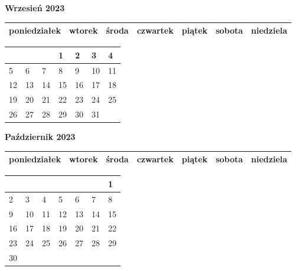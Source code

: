 \clearpage

\begin{landscape}
    \begin{center}
        \textbf{\huge{Wrzesień 2023}}
    \end{center}

    \vspace{-3mm}

    \thispagestyle{empty}
    \noindent
    \begin{tabularx}{28.7cm}{|Y|Y|Y|Y|Y|Y|Y|}
        \hline
poniedziałek & wtorek & środa & czwartek & piątek & sobota & niedziela \\ [-0.5mm]
        \hline
    \end{tabularx}

    \vspace{-0.5mm}

    \noindent
    \begin{tabularx}{28.7cm}{|X|X|X|X|X|X|X|}
        \hline
& & & 1 & 2 & 3 & 4 \\ [31.0mm]
\hline
5 & 6 & 7 & 8 & 9 & 10 & 11 \\ [31.0mm]
\hline
12 & 13 & 14 & 15 & 16 & 17 & 18 \\ [31.0mm]
\hline
19 & 20 & 21 & 22 & 23 & 24 & 25 \\ [31.0mm]
\hline
26 & 27 & 28 & 29 & 30 & 31 & \\ [31.0mm]
\hline

    \end{tabularx}
\end{landscape}

\clearpage

\begin{landscape}
    \begin{center}
        \textbf{\huge{Październik 2023}}
    \end{center}

    \vspace{-3mm}

    \thispagestyle{empty}
    \noindent
    \begin{tabularx}{28.7cm}{|Y|Y|Y|Y|Y|Y|Y|}
        \hline
poniedziałek & wtorek & środa & czwartek & piątek & sobota & niedziela \\ [-0.5mm]
        \hline
    \end{tabularx}

    \vspace{-0.5mm}

    \noindent
    \begin{tabularx}{28.7cm}{|X|X|X|X|X|X|X|}
        \hline
& & & & & & 1 \\ [25.0mm]
\hline
2 & 3 & 4 & 5 & 6 & 7 & 8 \\ [25.0mm]
\hline
9 & 10 & 11 & 12 & 13 & 14 & 15 \\ [25.0mm]
\hline
16 & 17 & 18 & 19 & 20 & 21 & 22 \\ [25.0mm]
\hline
23 & 24 & 25 & 26 & 27 & 28 & 29 \\ [25.0mm]
\hline
30 & & & & & & \\ [25.0mm]
\hline

    \end{tabularx}
\end{landscape}

